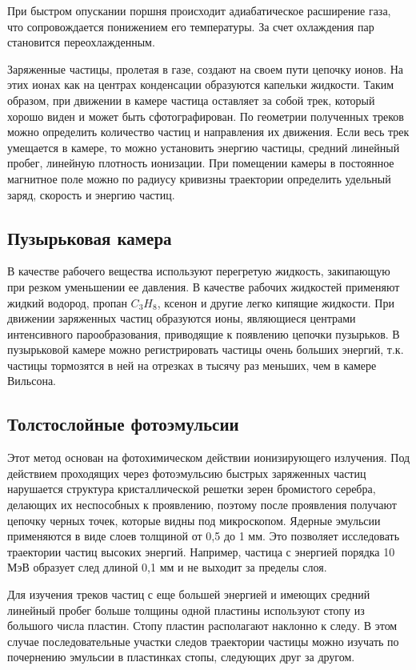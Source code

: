 \documentclass[14pt,pscyr,titlepage]{hedreport}
\begin{document}
		При быстром опускании поршня происходит адиабатическое расширение 
		газа, что сопровождается понижением его температуры. За счет 
		охлаждения пар становится переохлажденным. 

		Заряженные частицы, пролетая в газе, создают на своем пути цепочку 
		ионов. На этих ионах как на центрах конденсации образуются капельки 
		жидкости. Таким образом, при движении в камере частица оставляет за 
		собой трек, который хорошо виден и может быть сфотографирован. По 
		геометрии полученных треков можно определить количество частиц и 
		направления их движения. Если весь трек умещается в камере, то можно 
		установить энергию частицы, средний линейный пробег, линейную 
		плотность ионизации. При помещении камеры в постоянное магнитное 
		поле можно по радиусу кривизны траектории определить удельный заряд, 
		скорость и энергию частиц.

	\subsection{Пузырьковая камера}
		В качестве  рабочего вещества используют перегретую жидкость, 
		закипающую при резком уменьшении ее давления. В качестве рабочих 
		жидкостей применяют жидкий водород, пропан \( C_3 H_8 \), ксенон и 
		другие легко кипящие жидкости. При движении заряженных частиц 
		образуются ионы, являющиеся центрами интенсивного парообразования, 
		приводящие к появлению цепочки пузырьков. В пузырьковой камере можно 
		регистрировать частицы очень больших энергий, т.к. частицы тормозятся 
		в ней на отрезках в тысячу раз меньших, чем в камере Вильсона. 

	\subsection{Толстослойные фотоэмульсии}
		Этот метод основан на фотохимическом действии ионизирующего излучения. 
		Под действием проходящих через фотоэмульсию быстрых заряженных частиц 
		нарушается структура кристаллической решетки зерен бромистого серебра, 
		делающих их неспособных к проявлению, поэтому после проявления 
		получают цепочку черных точек, которые видны под микроскопом. Ядерные 
		эмульсии применяются в виде слоев толщиной от 0,5 до 1 мм. Это 
		позволяет исследовать траектории частиц высоких энергий. Например, 
		частица с энергией порядка 10 МэВ образует след длиной 0,1 мм и не 
		выходит за пределы слоя. 

    	Для изучения треков частиц с еще большей энергией и имеющих средний 
    	линейный пробег больше толщины одной пластины используют стопу из 
    	большого числа пластин.  Стопу пластин располагают наклонно к следу. 
    	В этом случае последовательные участки следов траектории частицы можно 
    	изучать по почернению эмульсии в пластинках стопы, следующих друг 
    	за другом. 
\end{document}
